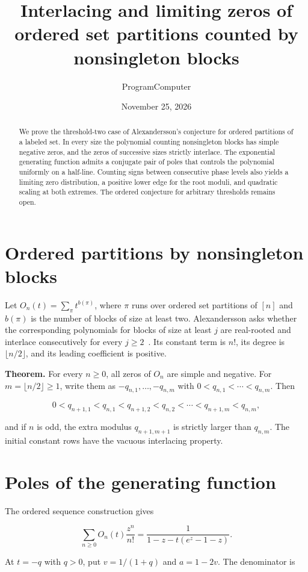 \documentclass[11pt]{article}
\title{Interlacing and limiting zeros of ordered set partitions counted by nonsingleton blocks}
\author{ProgramComputer}
\date{November 25, 2026}
\begin{document}
\maketitle
\begin{abstract}
We prove the threshold-two case of Alexandersson's conjecture for ordered partitions of a labeled set. In every size the polynomial counting nonsingleton blocks has simple negative zeros, and the zeros of successive sizes strictly interlace. The exponential generating function admits a conjugate pair of poles that controls the polynomial uniformly on a half-line. Counting signs between consecutive phase levels also yields a limiting zero distribution, a positive lower edge for the root moduli, and quadratic scaling at both extremes. The ordered conjecture for arbitrary thresholds remains open.
\end{abstract}
\section{Ordered partitions by nonsingleton blocks}

Let $O_n(t)=\sum_\pi t^{b(\pi)}$, where $\pi$ runs over ordered set partitions of $[n]$ and $b(\pi)$ is the number of blocks of size at least two. Alexandersson asks whether the corresponding polynomials for blocks of size at least $j$ are real-rooted and interlace consecutively for every $j\ge2$~\cite{alex}. Its constant term is $n!$, its degree is $\lfloor n/2\rfloor$, and its leading coefficient is positive.

\textbf{Theorem.} For every $n\ge0$, all zeros of $O_n$ are simple and negative. For $m=\lfloor n/2\rfloor\ge1$, write them as $-q_{n,1},\ldots,-q_{n,m}$ with $0<q_{n,1}<\cdots<q_{n,m}$. Then

\[
0<q_{n+1,1}<q_{n,1}<q_{n+1,2}<q_{n,2}<\cdots<q_{n+1,m}<q_{n,m},
\]

and if $n$ is odd, the extra modulus $q_{n+1,m+1}$ is strictly larger than $q_{n,m}$. The initial constant rows have the vacuous interlacing property.

\section{Poles of the generating function}

The ordered sequence construction gives

\[
\sum_{n\ge0}O_n(t)\frac{z^n}{n!}=\frac1{1-z-t(e^z-1-z)}.
\]

At $t=-q$ with $q>0$, put $v=1/(1+q)$ and $a=1-2v$. The denominator is
\end{document}
